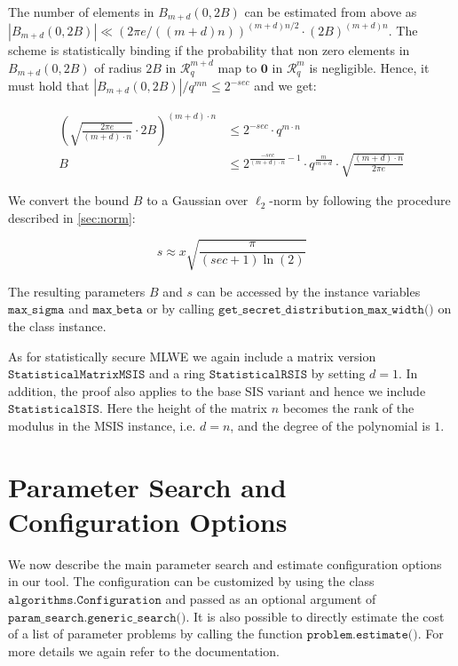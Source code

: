 The number of elements in $B_{m+d}(0, 2B)$ can be estimated from above as $|B_{m+d}(0, 2B)| \ll (2 \pi e /((m+d) n))^{(m+d) n/2} \cdot (2 B)^{(m+d) n}$. The scheme is statistically binding if the probability that non zero elements in $B_{m+d}(0, 2B)$ of radius $2B$ in $\mathcal{R}_q^{m+d}$ map to $\mathbf{0}$ in $\mathcal{R}_q^{m}$ is negligible. Hence, it must hold that $|B_{m+d}(0, 2B)|/q^{m n} \leq 2^{-sec}$ and we get:


\begin{align}
    \left(\sqrt{\frac{2 \pi e}{(m+d) \cdot n}} \cdot 2 B\right)^{(m+d) \cdot n} & \leq 2^{-sec} \cdot q^{m\cdot n}                                                                       \\
    B                                                                           & \leq 2^{\frac{-sec}{(m+d)\cdot n} - 1} \cdot q^\frac{m}{m+d} \cdot \sqrt{\frac{(m+d)\cdot n}{2 \pi e}}
\end{align}

We convert the bound $B$ to a Gaussian over $\ell_2$-norm by following the procedure described in \cref{sec:norm}: %

\begin{equation}
    s  \approx x \sqrt{\frac{\pi}{(sec + 1) \ln(2)}}
\end{equation}

The resulting parameters $B$ and $s$ can be accessed by the instance variables $\texttt{max\_sigma}$ and $\texttt{max\_beta}$ or by calling $\texttt{get\_secret\_distribution\_max\_width()}$ on the class instance.

As for statistically secure MLWE we again include a matrix version $\texttt{StatisticalMatrixMSIS}$ and a ring $\texttt{StatisticalRSIS}$ by setting $d=1$. In addition, the proof also applies to the base SIS variant and hence we include $\texttt{StatisticalSIS}$. Here the height of the matrix $n$ becomes the rank of the modulus in the MSIS instance, i.e. $d=n$, and the degree of the polynomial is $1$.




\section{Parameter Search and Configuration Options}
We now describe the main parameter search and estimate configuration options in our tool. The configuration can be customized by using the class $\texttt{algorithms.Configuration}$ and passed as an optional argument of $\texttt{param\_search.generic\_search()}$. It is also possible to directly estimate the cost of a list of parameter problems by calling the function $\texttt{problem.estimate()}$. For more details we again refer to the documentation.

